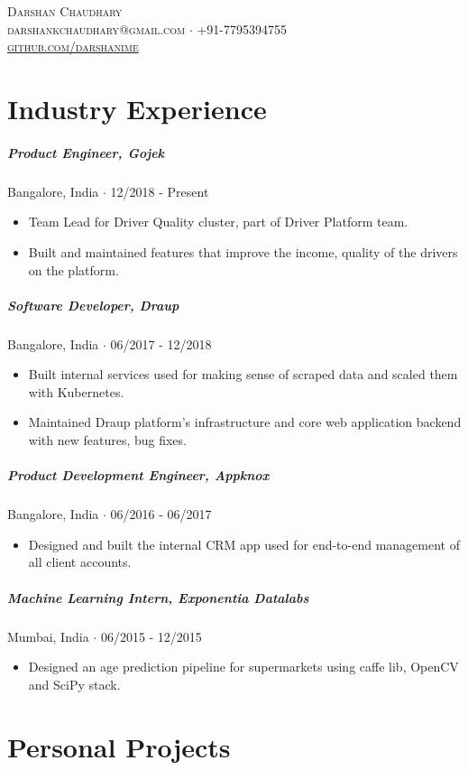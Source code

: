 \documentclass{article}
\newcommand{\namestyle}{\Huge \scshape}
\newcommand{\addressstyle}{\color{addresscolor} \footnotesize \rmfamily \upshape}
\begin{document}
\begin{center}
    \namestyle Darshan Chaudhary \\
    \addressstyle darshankchaudhary@gmail.com  $\cdot$ +91-7795394755  \\
    \href{https://github.com/darshanime}{\url{github.com/darshanime}}
\end{center}

\small
\section*{Industry Experience}

\subparagraph{Product Engineer, Gojek}
Bangalore, India $\cdot$ 12/2018 - Present
\begin{itemize}
    \item Team Lead for Driver Quality cluster, part of Driver Platform team.
    \item Built and maintained features that improve the income, quality of the drivers on the platform. 
\end{itemize}

\subparagraph{Software Developer, Draup}
Bangalore, India $\cdot$ 06/2017 - 12/2018
\begin{itemize}
    \item Built internal services used for making sense of scraped data and scaled them with Kubernetes.
    \item Maintained Draup platform's infrastructure and core web application backend with new features, bug fixes.
\end{itemize}

\subparagraph{Product Development Engineer, Appknox}
Bangalore, India $\cdot$ 06/2016 - 06/2017
\begin{itemize}
    \item Designed and built the internal CRM app used for end-to-end management of all client accounts.
\end{itemize}

\subparagraph{Machine Learning Intern, Exponentia Datalabs}
Mumbai, India $\cdot$ 06/2015 - 12/2015
\begin{itemize}
    \item Designed an age prediction pipeline for supermarkets using caffe lib, OpenCV and SciPy stack.
\end{itemize}


\section*{Personal Projects}
\end{document}
